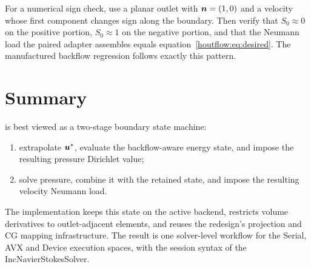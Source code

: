 For a numerical sign check, use a planar outlet with $\boldsymbol{n}=(1,0)$ and a
velocity whose first component changes sign along the boundary.  Then verify
that $S_0\approx0$ on the positive portion, $S_0\approx1$ on the negative
portion, and that the Neumann load the paired adapter assembles equals
equation~\eqref{houtflow:eq:desired}.  The manufactured backflow regression follows
exactly this pattern.

\section{Summary}

\HOutflow{} is best viewed as a two-stage boundary state machine:
\begin{enumerate}
  \item extrapolate $\boldsymbol{u}^*$, evaluate the backflow-aware energy state,
        and impose the resulting pressure Dirichlet value;
  \item solve pressure, combine it with the retained state, and impose the
        resulting velocity Neumann load.
\end{enumerate}
The implementation keeps this state on the active backend, restricts volume
derivatives to outlet-adjacent elements, and reuses the redesign's projection
and CG mapping infrastructure.  The result is one solver-level workflow for
the Serial, AVX and Device execution spaces, with the session syntax of the
IncNavierStokesSolver.
